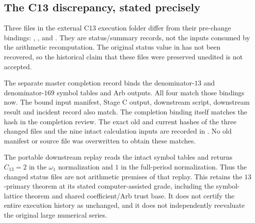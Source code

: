 \subsection{The C13 discrepancy, stated precisely}\label{subsec:c13custody}
Three files in the external C13 execution folder differ from their pre-change bindings: , , and . They are status/summary records, not the inputs consumed by the arithmetic recomputation. The original status value in  has not been recovered, so the historical claim that these files were preserved unedited is not accepted.

The separate master completion record binds the denominator-$13$ and denominator-$169$ symbol tables and Arb outputs. All four match those bindings now. The bound input manifest, Stage C output, downstream script, downstream result and incident record also match. The completion binding itself matches the hash in the completion review. The exact old and current hashes of the three changed files and the nine intact calculation inputs are recorded in
.
No old manifest or source file was overwritten to obtain these matches.

The portable downstream replay reads the intact symbol tables and returns $C_{13}=2$ in the $\omega_1$ normalization and $1$ in the full-period normalization. Thus the changed status files are not arithmetic premises of that replay. This retains the $13$-primary theorem at its stated computer-assisted grade, including the symbol-lattice theorem and shared coefficient/Arb trust base. It does not certify the entire execution history as unchanged, and it does not independently reevaluate the original large numerical series.
